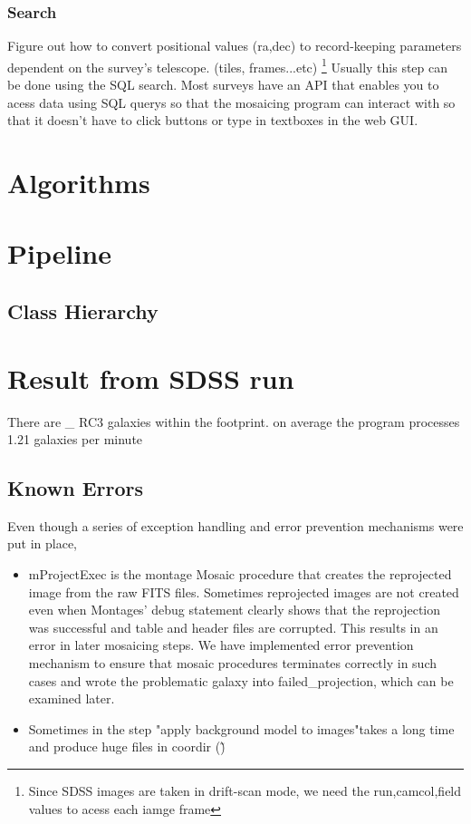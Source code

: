 \documentclass[5p]{elsarticle}
\begin{document}
		\subsubsection{Search}
			Figure out how to convert positional values (ra,dec) to record-keeping parameters dependent on the survey's telescope. (tiles, frames...etc) \footnote{Since SDSS images are taken in drift-scan mode, we need the run,camcol,field values to acess each iamge frame} Usually this step can be done using the SQL search. 
Most surveys have an API that enables you to acess data using SQL querys so that the mosaicing program can interact with so that it doesn't have to  click buttons or type in textboxes in the web GUI. 
\section{Algorithms}
\section{Pipeline}
	\subsection{Class Hierarchy}
\section{Result from SDSS run}
There are \_ RC3 galaxies within the footprint. 
on average the program processes 1.21 galaxies per minute
	\subsection{Known Errors}
		
	Even though a series of exception handling and error prevention mechanisms were put in place, 
	 	\begin{itemize}
	 		\item mProjectExec is the montage Mosaic procedure that creates the reprojected image from the raw FITS files. Sometimes reprojected images are not created even when Montages' debug statement clearly shows that the reprojection was successful and table and header files are corrupted. This results in an error in later mosaicing steps. We have implemented error prevention mechanism to ensure that mosaic procedures terminates correctly in such cases and wrote the problematic galaxy into failed\_projection, which can be examined later.
	 		\item Sometimes in the step "apply background model to images"takes a long time and produce huge files in coordir (\~)
	 	\end{itemize}
	
\end{document}

